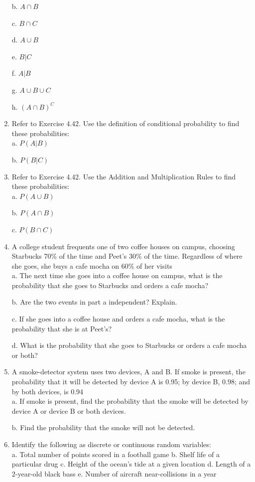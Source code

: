 \documentclass{article}
\begin{document}
\begin{enumerate}
b. $A \cap B$

c. $B \cap C$

d. $A \cup B$

e. $B|C$

f. $A|B$

g. $A \cup B \cup C$

h. $(A \cap B)^C$

\item Refer to Exercise 4.42. Use the definition of conditional probability to find these probabilities: \\
a. $P(A|B)$

b. $P(B|C)$
\item Refer to Exercise 4.42. Use the Addition and Multiplication Rules to find these probabilities: \\
a. $P(A \cup B)$

b. $P(A \cap B)$

c. $P(B \cap C)$
\item A college student frequents one of two coffee houses on campus, choosing Starbucks 70\% of the time and Peet’s 30\% of the time. Regardless of where she goes, she buys a cafe mocha on 60\% of her visits \\
a. The next time she goes into a coffee house on campus, what is the probability that she goes to Starbucks and orders a cafe mocha?

b. Are the two events in part a independent? Explain.

c. If she goes into a coffee house and orders a cafe mocha, what is the probability that she is at Peet’s?

d. What is the probability that she goes to Starbucks or orders a cafe mocha or both?
\item A smoke-detector system uses two devices, A and B. If smoke is present, the probability that it will be detected by device A is 0.95; by device B, 0.98; and by both devices, is 0.94 \\
a. If smoke is present, find the probability that the smoke will be detected by device A or device B or both devices.

b. Find the probability that the smoke will not be detected.

\item Identify the following as discrete or continuous random variables: \\
a. Total number of points scored in a football game
b. Shelf life of a particular drug
c. Height of the ocean’s tide at a given location
d. Length of a 2-year-old black bass
e. Number of aircraft near-collisions in a year


\end{enumerate}
\end{document}
